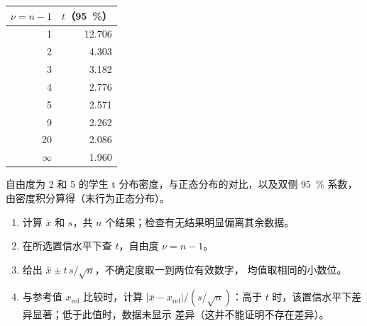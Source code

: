 \begin{omfigure}
\begin{minipage}[c]{0.56\linewidth}
\end{minipage}\hfill
\begin{minipage}[c]{0.4\linewidth}\centering
\small
\begin{tabular}{rr}
\hline
$\nu = n - 1$ & $t$（95~\%） \\
\hline
1 & 12.706 \\
2 & 4.303 \\
3 & 3.182 \\
4 & 2.776 \\
5 & 2.571 \\
9 & 2.262 \\
20 & 2.086 \\
$\infty$ & 1.960 \\
\hline
\end{tabular}
\end{minipage}
\par\vspace{4pt}

{\small 自由度为 2 和 5 的学生 t 分布密度，与正态分布的对比，以及双侧
95~\% 系数，由密度积分算得（末行为正态分布）。}
\end{omfigure}

\begin{method}[均值的置信区间]\label{met:b2:measurement-statistics:confidence-interval}
\begin{enumerate}
  \item 计算 $\bar x$ 和 $s$，共 $n$ 个结果；检查有无结果明显偏离其余数据。
  \item 在所选置信水平下查 $t$，自由度 $\nu = n - 1$。
  \item 给出 $\bar x \pm t\,s/\sqrt n$，不确定度取一到两位有效数字，
        均值取相同的小数位。
  \item 与参考值 $x_{\mathrm{ref}}$ 比较时，计算 $|\bar x - x_{\mathrm{ref}}|/(s/\sqrt
        n)$：高于 $t$ 时，该置信水平下差异显著；低于此值时，数据未显示
        差异（这并不能证明不存在差异）。
\end{enumerate}
\end{method}

